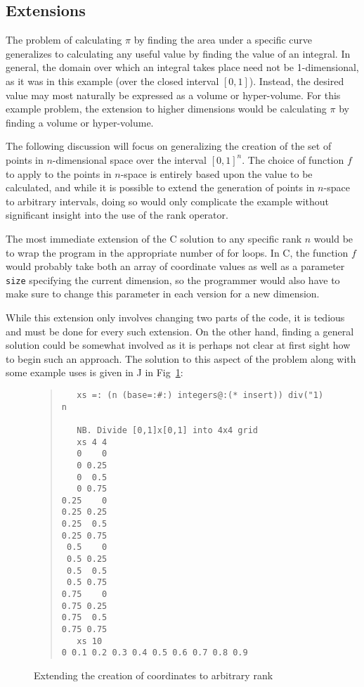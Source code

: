 \subsection{Extensions}
\label{piext}
The problem of calculating $\pi$ by finding the area under a specific curve 
generalizes to calculating any useful value by finding the value of an integral. 
In general, the domain over which an integral takes place need not be 1-dimensional, 
as it was in this example (over the closed interval $[0,1]$).
Instead, the desired value may most naturally be expressed as a volume or hyper-volume. 
For this example problem, the extension to higher dimensions would be
calculating $\pi$ by finding a volume or hyper-volume.

The following discussion will focus on generalizing the creation of 
the set of points in $n$-dimensional space over the interval $[0,1]^n$.
The choice of function $f$ to apply to the points in $n$-space 
is entirely based upon the value to be calculated, 
and while it is possible to extend the generation of points in $n$-space 
to arbitrary intervals, doing so would only complicate the example 
without significant insight into the use of the rank operator.

The most immediate extension of the C solution to any specific rank $n$ %
would be to wrap the program in the appropriate number of for loops. 
In C, the function $f$ would probably take both 
an array of coordinate values as well as a parameter \texttt{size} specifying the current dimension, 
so the programmer would also have to make sure to change this parameter in each version for a new dimension.

While this extension only involves changing two parts of the code, it is tedious 
and must be done for every such extension. 
On the other hand, finding a general solution could be somewhat involved 
as it is perhaps not clear at first sight how to begin such an approach.
The solution to this aspect of the problem along with some example uses is given in J in Fig~\ref{fig::xs_ext}:

\begin{figure}
\begin{quote}
\begin{singlespacing}
\begin{small}
\begin{verbatim}
   xs =: (n (base=:#:) integers@:(* insert)) div("1) n

   NB. Divide [0,1]x[0,1] into 4x4 grid
   xs 4 4
   0    0
   0 0.25
   0  0.5
   0 0.75
0.25    0
0.25 0.25
0.25  0.5
0.25 0.75
 0.5    0
 0.5 0.25
 0.5  0.5
 0.5 0.75
0.75    0
0.75 0.25
0.75  0.5
0.75 0.75
   xs 10
0 0.1 0.2 0.3 0.4 0.5 0.6 0.7 0.8 0.9
\end{verbatim}
\end{small}
\end{singlespacing}
\end{quote}
\caption{Extending the creation of coordinates to arbitrary rank}
\label{fig::xs_ext}
\end{figure}


